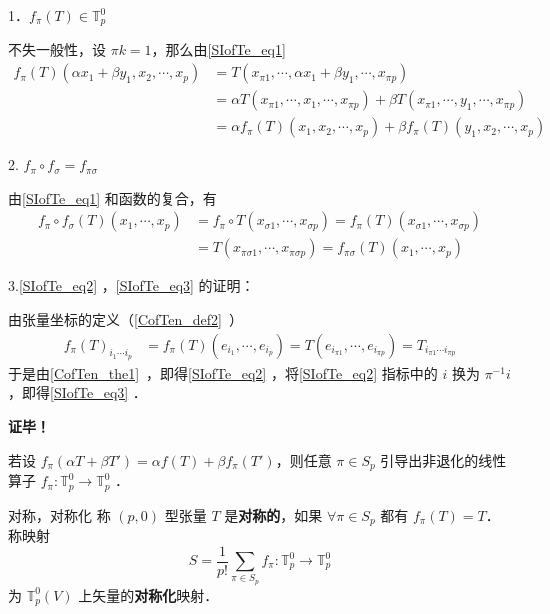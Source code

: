 1．$f_\pi(T)\in\mathbb{T}_p^0$

不失一般性，设 $\pi k=1$，那么由\autoref{SIofTe_eq1} 
\begin{equation}
\begin{aligned}
f_\pi(T)(\alpha x_1+\beta y_1,x_2,\cdots,x_p)&=T(x_{\pi1},\cdots,\alpha x_1+\beta y_1,\cdots,x_{\pi p})\\
&=\alpha T(x_{\pi1},\cdots,x_1,\cdots,x_{\pi p})+\beta T(x_{\pi1},\cdots,y_1,\cdots,x_{\pi p})\\
&=\alpha f_{\pi}(T)(x_1,x_2,\cdots,x_p)+\beta f_{\pi}(T)(y_1,x_2,\cdots,x_p)
\end{aligned}
\end{equation}

2. $f_\pi \circ f_\sigma=f_{\pi\sigma}$

由\autoref{SIofTe_eq1} 和函数的复合，有
\begin{equation}
\begin{aligned}
f_\pi\circ f_\sigma(T)(x_1,\cdots,x_p)&=f_\pi\circ T(x_{\sigma1},\cdots,x_{\sigma p})=f_\pi(T)(x_{\sigma1},\cdots,x_{\sigma p})\\
&=T(x_{\pi\sigma1},\cdots,x_{\pi\sigma p})=f_{\pi\sigma}(T)(x_1,\cdots,x_p)
\end{aligned}
\end{equation}


3.\autoref{SIofTe_eq2} ，\autoref{SIofTe_eq3} 的证明：

由张量坐标的定义（\autoref{CofTen_def2}~）
\begin{equation}
\begin{aligned}
f_{\pi}(T)_{i_1\cdots i_p}&=f_{\pi}(T)(e_{i_1},\cdots,e_{i_p})=T(e_{i_{\pi1}},\cdots,e_{i_{\pi p}})=T_{i_{\pi1}\cdots i_{\pi p}}
\end{aligned}
\end{equation}
于是由\autoref{CofTen_the1}~，即得\autoref{SIofTe_eq2} ，将\autoref{SIofTe_eq2} 指标中的 $i$ 换为  $\pi^{-1} i$，即得\autoref{SIofTe_eq3} ．

\textbf{证毕！}

若设 $f_\pi(\alpha T+\beta T')=\alpha f(T)+\beta f_\pi(T')$，则任意 $\pi \in S_p$ 引导出非退化的线性算子 $f_\pi:\mathbb{T}_p^0\rightarrow\mathbb{T}_p^0$ ．

\begin{definition}{对称，对称化}
称 $(p,0)$ 型张量 $T$ 是\textbf{对称的}，如果 $\forall \pi\in S_p$ 都有 $f_{\pi}(T)=T$．称映射 
\begin{equation}
S=\frac{1}{p!}\sum_{\pi\in S_p} f_\pi:\mathbb{T}_p^0\rightarrow\mathbb{T}_p^0
\end{equation}
为 $\mathbb{T}_p^0(V)$ 上矢量的\textbf{对称化}映射．
\end{definition}

